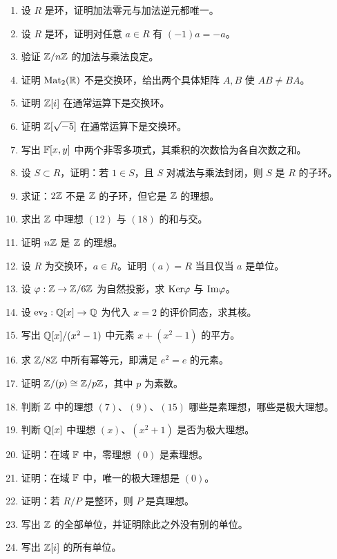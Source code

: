 \begin{enumerate}[label=\textbf{9.\arabic*}, leftmargin=*]
  \item \basic 设 $R$ 是环，证明加法零元与加法逆元都唯一。
  \item \basic 设 $R$ 是环，证明对任意 $a\in R$ 有 $(-1)a=-a$。
  \item \basic 验证 $\mathbb{Z}/n\mathbb{Z}$ 的加法与乘法良定。
  \item \basic 证明 $\mathrm{Mat}_2(\mathbb{R})$ 不是交换环，给出两个具体矩阵 $A,B$ 使 $AB\neq BA$。
  \item \basic 证明 $\mathbb{Z}[i]$ 在通常运算下是交换环。
  \item \basic 证明 $\mathbb{Z}[\sqrt{-5}]$ 在通常运算下是交换环。
  \item \basic 写出 $\mathbb{F}[x,y]$ 中两个非零多项式，其乘积的次数恰为各自次数之和。
  \item \basic 设 $S\subset R$，证明：若 $1\in S$，且 $S$ 对减法与乘法封闭，则 $S$ 是 $R$ 的子环。
  \item \basic 求证：$2\mathbb{Z}$ 不是 $\mathbb{Z}$ 的子环，但它是 $\mathbb{Z}$ 的理想。
  \item \basic 求出 $\mathbb{Z}$ 中理想 $(12)$ 与 $(18)$ 的和与交。
  \item \basic 证明 $n\mathbb{Z}$ 是 $\mathbb{Z}$ 的理想。
  \item \basic 设 $R$ 为交换环，$a\in R$。证明 $(a)=R$ 当且仅当 $a$ 是单位。
  \item \basic 设 $\varphi:\mathbb{Z}\to \mathbb{Z}/6\mathbb{Z}$ 为自然投影，求 $\mathrm{Ker}\varphi$ 与 $\mathrm{Im}\varphi$。
  \item \basic 设 $\operatorname{ev}_2:\mathbb{Q}[x]\to \mathbb{Q}$ 为代入 $x=2$ 的评价同态，求其核。
  \item \basic 写出 $\mathbb{Q}[x]/(x^2-1)$ 中元素 $x+(x^2-1)$ 的平方。
  \item \basic 求 $\mathbb{Z}/8\mathbb{Z}$ 中所有幂等元，即满足 $e^2=e$ 的元素。
  \item \basic 证明 $\mathbb{Z}/(p)\cong \mathbb{Z}/p\mathbb{Z}$，其中 $p$ 为素数。
  \item \basic 判断 $\mathbb{Z}$ 中的理想 $(7)$、$(9)$、$(15)$ 哪些是素理想，哪些是极大理想。
  \item \basic 判断 $\mathbb{Q}[x]$ 中理想 $(x)$、$(x^2+1)$ 是否为极大理想。
  \item \basic 证明：在域 $\mathbb{F}$ 中，零理想 $(0)$ 是素理想。
  \item \basic 证明：在域 $\mathbb{F}$ 中，唯一的极大理想是 $(0)$。
  \item \basic 证明：若 $R/P$ 是整环，则 $P$ 是真理想。
  \item \basic 写出 $\mathbb{Z}$ 的全部单位，并证明除此之外没有别的单位。
  \item \basic 写出 $\mathbb{Z}[i]$ 的所有单位。

\end{enumerate}
